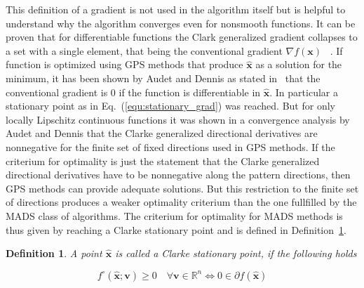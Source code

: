 \documentclass[a4paper,10pt]{article}
\newtheorem{definition}{Definition}
\renewcommand{\vec}[1]{\mathbf{#1}}
\newcommand{\equref}[1]{Eq.~(\ref{#1})}
\newcommand{\defref}[1]{Definition~\ref{#1}}
\begin{document}
    This definition of a gradient is not used in the algorithm itself
    but is helpful to understand why the algorithm converges even
    for nonsmooth functions.
    It can be proven that for differentiable functions the Clark
    generalized gradient collapses to a set with a single element,
    that being the conventional gradient $\nabla f(\vec{x})$
    ~\cite{mads_original}.
    If function is optimized using GPS methods 
    that produce $\vec{\hat{x}}$ as a solution for the minimum,
    it has been shown by Audet and Dennis as stated in~\cite{mads_original}
    that the conventional gradient is 0 if the function is
    differentiable in $\vec{\hat{x}}$.
    In particular a stationary point as in \equref{equ:stationary_grad}
    was reached.
    But for only locally Lipschitz continuous functions it was shown
    in a convergence analysis by Audet and Dennis that the Clarke 
    generalized directional
    derivatives are nonnegative for the finite set of fixed directions
    used in GPS methods.
    If the criterium for optimality is just the statement that the
    Clarke generalized directional derivatives have to be nonnegative
    along the pattern directions, then GPS methods can provide
    adequate solutions.
    But this restriction to the finite set of directions produces a 
    weaker optimality criterium than the one fullfilled by the
    MADS class of algorithms.
    The criterium for optimality for MADS methods is thus given by
    reaching a Clarke stationary point and is defined in 
    \defref{def:stationary_clarke}.
    
    \begin{definition}
        \label{def:stationary_clarke}
        A point $\vec{\hat{x}}$ is called a Clarke stationary point,
        if the following holds
        
        \begin{equation}
            f^{\circ}(\vec{\hat{x}}; \vec{v}) \geq 0 \quad \forall
             \vec{v} \in \mathbb{R}^n
            \Longleftrightarrow
            0 \in \partial f(\vec{\hat{x}})
        \end{equation}
    \end{definition}
\end{document}
